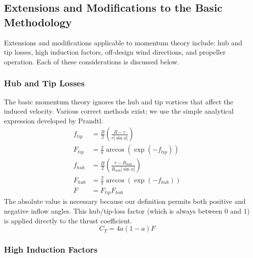\documentclass{article}
\begin{document}
\subsection{Extensions and Modifications to the Basic Methodology}

Extensions and modifications applicable to momentum theory include: hub and tip losses, high induction factors, off-design wind directions, and propeller operation.  Each of these considerations is discussed below.

\subsubsection{Hub and Tip Losses}

The basic momentum theory ignores the hub and tip vortices that affect the induced velocity.  Various correct methods exist; we use the simple analytical expression developed by Prandtl\cite{Glauert1935-Airplane-Propellers}.
\begin{equation}
    \begin{aligned}
    f_{tip} &= \frac{B}{2} \left(\frac{R - r}{r|\sin\phi|} \right)\\
    F_{tip} &= \frac{2}{\pi} \arccos(\exp(-f_{tip}))\\
    f_{hub} &= \frac{B}{2} \left(\frac{r - R_{hub}}{R_{hub}|\sin\phi|} \right)\\
    F_{hub} &= \frac{2}{\pi} \arccos(\exp(-f_{hub}))\\
    F &= F_{tip}F_{hub}
    \end{aligned}
\end{equation}
The absolute value is necessary because our definition permits both positive and negative inflow angles.  This hub/tip-loss factor (which is always between 0 and 1) is applied directly to the thrust coefficient.
\begin{equation}
    C_T = 4 a (1 - a) F
    \label{eq:CTmom2}
\end{equation}

\subsubsection{High Induction Factors}
\end{document}
